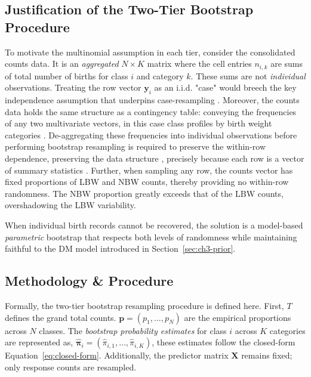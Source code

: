 \subsection{Justification of the Two-Tier Bootstrap Procedure}
\label{sec:ch3-justifiaction}
To motivate the multinomial assumption in each tier, consider the consolidated counts data. It is an \emph{aggregated} \(N \times K\) matrix where the cell entries \(n_{i,k}\) are sums of total number of births for class \(i\) and category \(k\). These sums are not \emph{individual} observations. Treating the row vector \(\mathbf{y}_i\) as an i.i.d. "case" would breech the key independence assumption that underpins case-resampling \parencite[slide 47]{case_resampling} \parencite{math10244671}. Moreover, the counts data holds the same structure as a contingency table: conveying the frequencies of any two multivariate vectors, in this case class profiles by birth weight categories \parencite{wiki:contingency}. De-aggregating these frequencies into individual observations before performing bootstrap resampling is required to preserve the within-row dependence, preserving the data structure \parencite{stackexchangeBootstrapResampling}, precisely because each row is a vector of summary statistics \parencite{wiki:summary_statistic}. Further, when sampling any row, the counts vector has fixed proportions of LBW and NBW counts, thereby providing no within-row randomness. The NBW proportion greatly exceeds that of the LBW counts, overshadowing the LBW variability. 

When individual birth records cannot be recovered, the solution is a model-based \emph{parametric} bootstrap that respects both levels of randomness while maintaining faithful to the DM model introduced in Section~\ref{sec:ch3-prior}.

\subsection{Methodology \& Procedure}
\label{sec:ch3-boot-method}
Formally, the two-tier bootstrap resampling procedure is defined here. First, \(T\) defines the grand total counts. \(\mathbf{p} = (p_1, \dots, p_N)\) are the empirical proportions across \(N\) classes. The \emph{bootstrap probability estimates} for class \(i\)  across \(K\) categories are represented as, \(\boldsymbol{\hat{\pi}}_i = (\hat{\pi}_{i,1}, \dots,\hat{\pi}_{i,K})\), these estimates follow the closed-form Equation~\ref{eq:closed-form}. Additionally, the predictor matrix \(\mathbf{X}\) remains fixed; only response counts are resampled.

